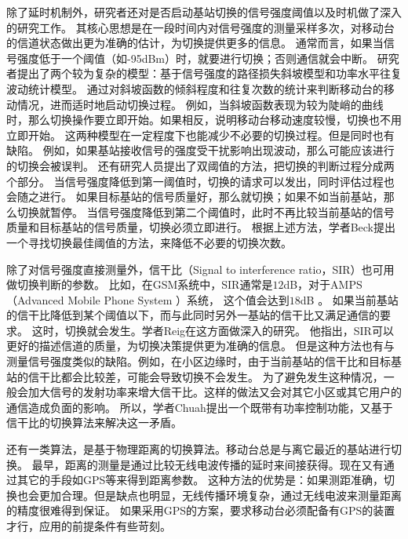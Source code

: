 除了延时机制外，研究者还对是否启动基站切换的信号强度阈值以及时机做了深入的研究工作。
其核心思想是在一段时间内对信号强度的测量采样多次，对移动台的信道状态做出更为准确的估计，为切换提供更多的信息。
通常而言，如果当信号强度低于一个阈值（如-95dBm）时，就要进行切换；否则通信就会中断。
研究者提出了两个较为复杂的模型：基于信号强度的路径损失斜坡模型和功率水平往复波动统计模型\cite{William1995}。
通过对斜坡函数的倾斜程度和往复次数的统计来判断移动台的移动情况，进而适时地启动切换过程。
例如，当斜坡函数表现为较为陡峭的曲线时，那么切换操作要立即开始。如果相反，说明移动台移动速度较慢，切换也不用立即开始。
这两种模型在一定程度下也能减少不必要的切换过程。但是同时也有缺陷。
例如，如果基站接收信号的强度受干扰影响出现波动，那么可能应该进行的切换会被误判。
还有研究人员提出了双阈值的方法，把切换的判断过程分成两个部分。
当信号强度降低到第一阈值时，切换的请求可以发出，同时评估过程也会随之进行。
如果目标基站的信号质量好，那么就切换；如果不如当前基站，那么切换就暂停。
当信号强度降低到第二个阈值时，此时不再比较当前基站的信号质量和目标基站的信号质量，切换必须立即进行。
根据上述方法，学者Beck提出一个寻找切换最佳阈值的方法，来降低不必要的切换次数\cite{40070}。

\par 除了对信号强度直接测量外，信干比（Signal to interference ratio，SIR）也可用做切换判断的参数。
比如，在GSM系统中，SIR通常是$12$dB，对于AMPS（Advanced Mobile Phone System ）系统， 这个值会达到$18$dB \cite{Tripathi2010}。
如果当前基站的信干比降低到某个阈值以下，而与此同时另外一基站的信干比又满足通信的要求。
这时，切换就会发生。学者Reig在这方面做深入的研究\cite{1658431}\cite{1390624}\cite{1370826}。
他指出，SIR可以更好的描述信道的质量，为切换决策提供更为准确的信息。
但是这种方法也有与测量信号强度类似的缺陷。例如，在小区边缘时，由于当前基站的信干比和目标基站的信干比都会比较差，可能会导致切换不会发生。
为了避免发生这种情况，一般会加大信号的发射功率来增大信干比。这样的做法又会对其它小区或其它用户的通信造成负面的影响。
所以，学者Chuah提出一个既带有功率控制功能，又基于信干比的切换算法来解决这一矛盾\cite{504935}。


\par 还有一类算法，是基于物理距离的切换算法。移动台总是与离它最近的基站进行切换。
最早，距离的测量是通过比较无线电波传播的延时来间接获得\cite{Rolle1986}。现在又有通过其它的手段如GPS等来得到距离参数\cite{5349100}\cite{4534769}。
这种方法的优势是：如果测距准确，切换也会更加合理。但是缺点也明显，无线传播环境复杂，通过无线电波来测量距离的精度很难得到保证。
如果采用GPS的方案，要求移动台必须配备有GPS的装置才行，应用的前提条件有些苛刻。

